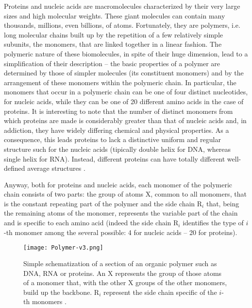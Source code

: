 Proteins and nucleic acids are macromolecules characterized by their very large sizes and high molecular weights. These giant molecules can contain many thousands, millions, even billions, of atoms. Fortunately, they are polymers, i.e. long molecular chains built up by the repetition of a few relatively simple subunits, the monomers, that are linked together in a linear fashion. The polymeric nature of these biomolecules, in spite of their huge dimension, lead to a simplification of their description -- the basic properties of a polymer are determined by those of simpler molecules (its constituent monomers) and by the arrangement of these monomers within the polymeric chain. In particular, the monomers that occur in a polymeric chain can be one of four distinct nucleotides, for nucleic acids, while they can be one of 20 different amino acids in the case of proteins. It is interesting to note that the number of distinct monomers from which proteins are made is considerably greater than that of nucleic acids and, in addiction, they have widely differing chemical and physical properties. As a consequence, this leads proteins to lack a distinctive uniform and regular structure such for the nucleic acids (tipically double helix for DNA, whereas single helix for RNA). Instead, different proteins can have totally different well-defined average structures \cite{voet2016fundamentals}.

Anyway, both for proteins and nucleic acids, each monomer of the polymeric chain consists of two parts: 
the group of atoms X, common to all monomers, that  is the constant repeating part of the polymer and the side chain R$_i$ that, being  the remaining atoms of the monomer, represents the variable part of the chain and is specific to each amino acid (indeed the side chain R$_i$ identifies the type of $i$-th monomer among the several possible: 4 for nucleic acids -- 20 for proteins).

\begin{figure}[h]
\centering
\begin{minipage}[t]{0.8\textwidth}
\centering
\texttt{[image: Polymer-v3.png]}

\caption{\small{Simple schematization of a section of an organic polymer such as DNA, RNA or proteins. An X represents the group of those atoms of a monomer that, with the other X groups of the other monomers, build up the backbone. R$_i$ represent the side chain specific of the $i$-th monomers
 \cite{creighton2010biophysical}.}}

\label{fig:Polymer}
\end{minipage} 
\end{figure}

